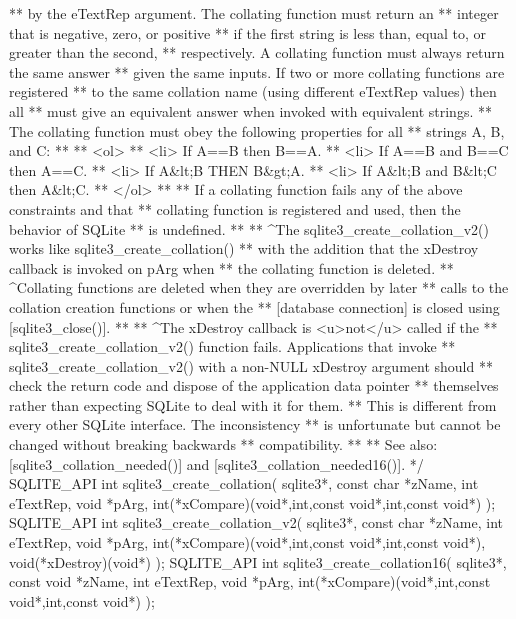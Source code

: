 \begin{Codex}[label=sqlite3.h,numbers=left]
{** by the eTextRep argument.  The collating function must return an
** integer that is negative, zero, or positive
** if the first string is less than, equal to, or greater than the second,
** respectively.  A collating function must always return the same answer
** given the same inputs.  If two or more collating functions are registered
** to the same collation name (using different eTextRep values) then all
** must give an equivalent answer when invoked with equivalent strings.
** The collating function must obey the following properties for all
** strings A, B, and C:
**
** <ol>
** <li> If A==B then B==A.
** <li> If A==B and B==C then A==C.
** <li> If A&lt;B THEN B&gt;A.
** <li> If A&lt;B and B&lt;C then A&lt;C.
** </ol>
**
** If a collating function fails any of the above constraints and that
** collating function is  registered and used, then the behavior of SQLite
** is undefined.
**
** ^The sqlite3_create_collation_v2() works like sqlite3_create_collation()
** with the addition that the xDestroy callback is invoked on pArg when
** the collating function is deleted.
** ^Collating functions are deleted when they are overridden by later
** calls to the collation creation functions or when the
** [database connection] is closed using [sqlite3_close()].
**
** ^The xDestroy callback is <u>not</u> called if the 
** sqlite3_create_collation_v2() function fails.  Applications that invoke
** sqlite3_create_collation_v2() with a non-NULL xDestroy argument should 
** check the return code and dispose of the application data pointer
** themselves rather than expecting SQLite to deal with it for them.
** This is different from every other SQLite interface.  The inconsistency 
** is unfortunate but cannot be changed without breaking backwards 
** compatibility.
**
** See also:  [sqlite3_collation_needed()] and [sqlite3_collation_needed16()].
*/
SQLITE_API int sqlite3_create_collation(
  sqlite3*, 
  const char *zName, 
  int eTextRep, 
  void *pArg,
  int(*xCompare)(void*,int,const void*,int,const void*)
);
SQLITE_API int sqlite3_create_collation_v2(
  sqlite3*, 
  const char *zName, 
  int eTextRep, 
  void *pArg,
  int(*xCompare)(void*,int,const void*,int,const void*),
  void(*xDestroy)(void*)
);
SQLITE_API int sqlite3_create_collation16(
  sqlite3*, 
  const void *zName,
  int eTextRep, 
  void *pArg,
  int(*xCompare)(void*,int,const void*,int,const void*)
);

}
\end{Codex}
